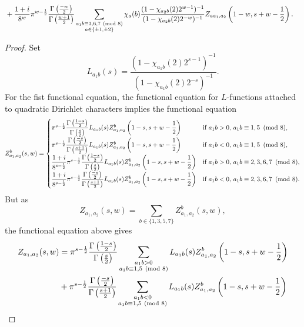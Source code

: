 \begin{theorem}
\begin{align*}
            &+\frac{1+i}{8^{w}}\pi^{w-\frac{1}{2}}\frac{\Gamma\left(\frac{-w}{2}\right)}{\Gamma\left(\frac{w+1}{2}\right)}\sum_{\substack{a_{1}b \equiv 3,6,7 \ \left(\text{mod }8\right) \\ a \in \{\pm1,\pm2\}}}\chi_{a}(b)\frac{(1-\chi_{a_{2}b}(2)2^{w-1})^{-1}}{(1-\chi_{a_{2}b}(2)2^{-w})^{-1}}Z_{aa_{1},a_{2}}\left(1-w,s+w-\frac{1}{2}\right).
        \end{align*}
    \end{theorem}
    \begin{proof}
        Set
        \[
            L_{a_{1}b}(s) = \frac{(1-\chi_{a_{1}b}(2)2^{s-1})^{-1}}{(1-\chi_{a_{1}b}(2)2^{-s})^{-1}}.
        \]
        For the fist functional equation, the functional equation for $L$-functions attached to quadratic Dirichlet characters implies the functional equation
        \[
            Z_{a_{1},a_{2}}^{b}(s,w) = \begin{cases} \pi^{s-\frac{1}{2}}\dfrac{\Gamma\left(\frac{1-s}{2}\right)}{\Gamma\left(\frac{s}{2}\right)}L_{a_{1}b}(s)Z_{a_{1},a_{2}}^{b}\left(1-s,s+w-\dfrac{1}{2}\right) & \text{if $a_{1}b > 0$, $a_{1}b \equiv 1,5 \ \left(\text{mod }8\right)$}, \\ \pi^{s-\frac{1}{2}}\dfrac{\Gamma\left(\frac{-s}{2}\right)}{\Gamma\left(\frac{s+1}{2}\right)}L_{a_{1}b}(s)Z_{a_{1},a_{2}}^{b}\left(1-s,s+w-\dfrac{1}{2}\right) & \text{if $a_{1}b < 0$, $a_{1}b \equiv 1,5 \ \left(\text{mod }8\right)$}, \\ \dfrac{1+i}{8^{s-\frac{1}{2}}}\pi^{s-\frac{1}{2}}\dfrac{\Gamma\left(\frac{1-s}{2}\right)}{\Gamma\left(\frac{s}{2}\right)}L_{a_{1}b}(s)Z_{a_{1},a_{2}}^{b}\left(1-s,s+w-\dfrac{1}{2}\right) & \text{if $a_{1}b > 0$, $a_{1}b \equiv 2,3,6,7 \ \left(\text{mod }8\right)$}, \\ \dfrac{1+i}{8^{s-\frac{1}{2}}}\pi^{s-\frac{1}{2}}\dfrac{\Gamma\left(\frac{-s}{2}\right)}{\Gamma\left(\frac{s+1}{2}\right)}L_{a_{1}b}(s)Z_{a_{1},a_{2}}^{b}\left(1-s,s+w-\dfrac{1}{2}\right) & \text{if $a_{1}b < 0$, $a_{1}b \equiv 2,3,6,7 \ \left(\text{mod }8\right)$}. \end{cases}
        \]
        But as
        \[
            Z_{a_{1},a_{2}}(s,w) = \sum_{b \in \{1,3,5,7\}}Z_{a_{1},a_{2}}^{b}(s,w),
        \]
        the functional equation above gives
        \begin{align*}
            Z_{a_{1},a_{2}}(s,w) &= \pi^{s-\frac{1}{2}}\frac{\G\left(\frac{1-s}{2}\right)}{\G\left(\frac{s}{2}\right)}\sum_{\substack{a_{1}b > 0 \\ a_{1}b \equiv 1,5 \tmod{8}}}L_{a_{1}b}(s)Z_{a_{1},a_{2}}^{b}\left(1-s,s+w-\frac{1}{2}\right) \\
            &+\pi^{s-\frac{1}{2}}\frac{\G\left(\frac{-s}{2}\right)}{\G\left(\frac{s+1}{2}\right)}\sum_{\substack{a_{1}b < 0 \\ a_{1}b \equiv 1,5 \tmod{8}}}L_{a_{1}b}(s)Z_{a_{1},a_{2}}^{b}\left(1-s,s+w-\frac{1}{2}\right) \\

\end{align*}
\end{proof}
